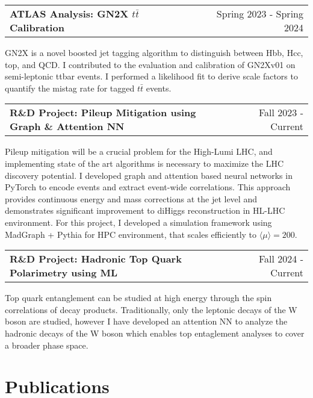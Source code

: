 \documentclass[a4paper,12pt]{article}
\makeatletter
\newenvironment{jobshort}[2]
    {
    \begin{tabularx}{\linewidth}{@{}l X r@{}}
    \textbf{#1} & \hfill &  #2 \\[3.75pt]
    \end{tabularx}
    }
    {
    }
\makeatother
\begin{document}
\begin{jobshort}{ATLAS Analysis: GN2X $t\bar{t}$ Calibration}{Spring 2023 - Spring 2024}
GN2X is a novel boosted jet tagging algorithm to distinguish between Hbb, Hcc, top, and QCD.
I contributed to the evaluation and calibration of GN2Xv01 on semi-leptonic ttbar events.
I performed a likelihood fit to derive scale factors to quantify the mistag rate for tagged $t\bar{t}$ events.
\end{jobshort}

\begin{jobshort}{R\&D Project: Pileup Mitigation using Graph \& Attention NN}{Fall 2023 - Current}
Pileup mitigation will be a crucial problem for the High-Lumi LHC, and implementing state of the art algorithms is necessary to maximize the LHC discovery potential.
I developed graph and attention based neural networks in PyTorch to encode events and extract event-wide correlations.
This approach provides continuous energy and mass corrections at the jet level and demonstrates significant improvement to diHiggs reconstruction in HL-LHC environment.
For this project, I developed a simulation framework using MadGraph + Pythia for HPC environment, that scales efficiently to $\langle \mu \rangle=200$.
\end{jobshort}

\begin{jobshort}{R\&D Project: Hadronic Top Quark Polarimetry using ML}{Fall 2024 - Current}
Top quark entanglement can be studied at high energy through the spin correlations of decay products. Traditionally, only the leptonic decays of the W boson are studied, however I have developed an attention NN to analyze the hadronic decays of the W boson which enables top entaglement analyses to cover a broader phase space.
\end{jobshort}

\section{Publications}
\begin{refsection}
\nocite{*}
\printbibliography[heading=none]
\end{refsection}

\end{document}
